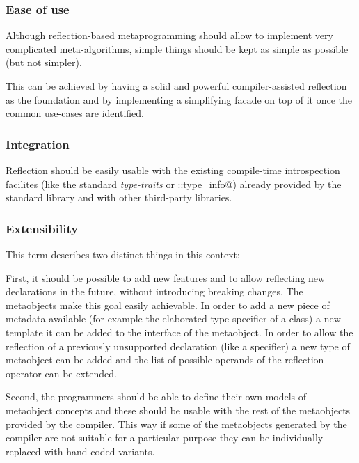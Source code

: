 \subsubsection{Ease of use}
\label{design-ease-of-use}

Although reflection-based metaprogramming should allow to implement very
complicated meta-algorithms, simple things should be kept as simple as possible
(but not simpler).

This can be achieved by having a solid and powerful compiler-assisted reflection
as the foundation and by implementing a simplifying facade on top of it once
the common use-cases are identified.

\subsubsection{Integration}
\label{design-integration}

Reflection should be easily
usable with the existing compile-time introspection facilites (like the standard
{\em type-traits} or \verb@std::type_info@)
already provided by the standard library and with other third-party libraries.

\subsubsection{Extensibility}
\label{design-extensibility}

This term describes two distinct things in this context:

First, it should be possible to add new features and to allow reflecting new declarations
in the future, without introducing breaking changes. The metaobjects make this
goal easily achievable. In order to add a new piece of metadata available
(for example the elaborated type specifier of a class) a new template 
it can be added to the interface of the metaobject. In order to allow the reflection
of a previously unsupported declaration (like a specifier) a new type of metaobject
can be added and the list of possible operands of the reflection operator
can be extended.

Second, the programmers should be able to define their own models of metaobject concepts
and these should be usable with the rest of the metaobjects provided by the
compiler. This way if some of the metaobjects generated by the compiler are not
suitable for a particular purpose they can be individually replaced with
hand-coded variants.


